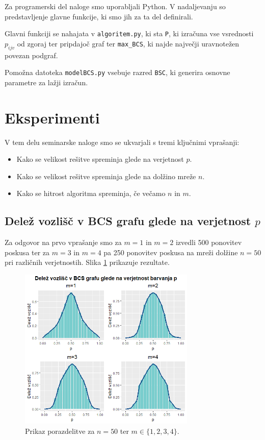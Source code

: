 \documentclass[a4paper, 11pt]{article}
\theoremstyle{definition}
\theoremstyle{definition}
\begin{document}
    
Za programerski del naloge smo uporabljali Python. V nadaljevanju so predstavljenje glavne funkcije, 
ki smo jih za ta del definirali.

Glavni funkciji se nahajata v \verb+algoritem.py+, ki 
sta \verb+P+, ki izračuna vse vsrednosti $p_{ijv}$ od zgoraj ter 
pripdajoč graf ter \verb+max_BCS+, ki najde največji
uravnotežen povezan podgraf.  

Pomožna datoteka \verb+modelBCS.py+ vsebuje razred
\verb+BSC+, ki generira osnovne parametre za lažji izračun.
\newpage

\section{Eksperimenti}

V tem delu seminarske naloge smo se ukvarjali s tremi ključnimi vprašanji:
    
\begin{itemize}
\item 
Kako se velikost rešitve spreminja glede na verjetnost $p$.
\item
Kako se velikost rešitve spreminja glede na dolžino mreže $n$.
\item 
Kako se hitrost algoritma spreminja, če večamo $n$ in $m$.
\end{itemize}

\subsection{Delež vozlišč v BCS grafu glede na verjetnost $p$} 

Za odgovor na prvo vprašanje smo za $m=1$ in $m=2$ izvedli 500 ponovitev 
poskusa ter za $m=3$ in $m=4$ pa 250 ponovitev poskusa na mreži dolžine $n=50$ pri različnih verjetnostih. 
Slika \ref{fig:verj} prikazuje rezultate.

\begin{figure}[ht!]
    \centering
    \includegraphics[width=0.75\textwidth]{verj.png}
    \caption{Prikaz porazdelitve za $n=50$ ter $m \in \{ 1,2,3,4 \}$.}
    \label{fig:verj}
\end{figure}
\end{document}
